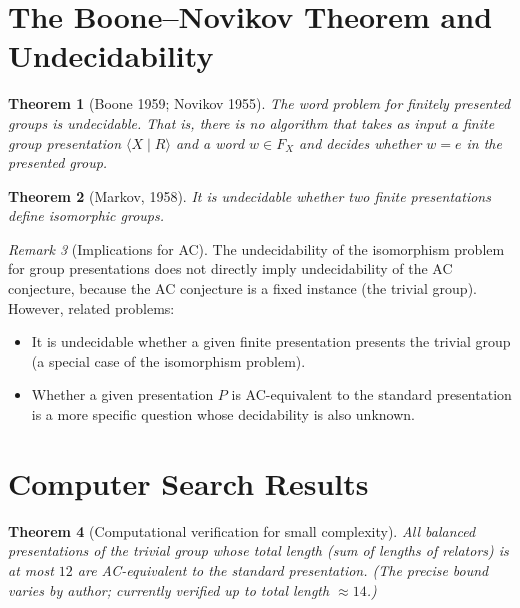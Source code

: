 \documentclass[12pt,a4paper]{amsart}
\newtheorem{theorem}{Theorem}[section]
\theoremstyle{definition}
\theoremstyle{remark}
\newtheorem{remark}[theorem]{Remark}
\begin{document}
\section{The Boone--Novikov Theorem and Undecidability}

\begin{theorem}[Boone 1959; Novikov 1955]\label{thm:BN}
The word problem for finitely presented groups is undecidable. That is, there
is no algorithm that takes as input a finite group presentation
$\langle X \mid R \rangle$ and a word $w \in F_X$ and decides whether $w = e$
in the presented group.
\end{theorem}

\begin{theorem}[Markov, 1958]\label{thm:markov}
It is undecidable whether two finite presentations define isomorphic groups.
\end{theorem}

\begin{remark}[Implications for AC]\label{rem:undec}
The undecidability of the isomorphism problem for group presentations does not
directly imply undecidability of the AC conjecture, because the AC conjecture
is a fixed instance (the trivial group). However, related problems:
\begin{itemize}
  \item It is undecidable whether a given finite presentation presents the
        trivial group (a special case of the isomorphism problem).
  \item Whether a given presentation $P$ is AC-equivalent to the standard
        presentation is a more specific question whose decidability is also
        unknown.
\end{itemize}
\end{remark}

\section{Computer Search Results}

\begin{theorem}[Computational verification for small complexity]\label{thm:comp}
All balanced presentations of the trivial group whose total length (sum of lengths
of relators) is at most $12$ are AC-equivalent to the standard presentation.
(The precise bound varies by author; currently verified up to total length $\approx 14$.)
\end{theorem}
\end{document}
